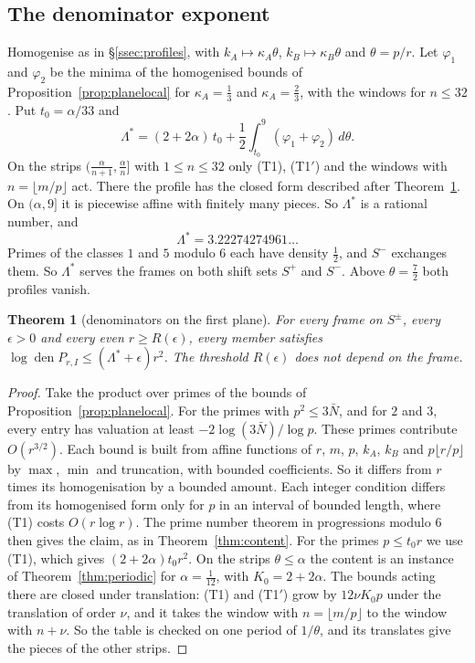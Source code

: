 \documentclass[11pt]{amsart}
\newtheorem{theorem}{Theorem}[section]
\theoremstyle{definition}
\theoremstyle{remark}
\numberwithin{equation}{section}
\newcommand{\den}{\operatorname{den}}
\begin{document}
\subsection{The denominator exponent}
Homogenise as in \S\ref{ssec:profiles}, with $k_A\mapsto\kappa_A\theta$, $k_B\mapsto\kappa_B\theta$ and $\theta=p/r$. Let
$\varphi_1$ and $\varphi_2$ be the minima of the homogenised bounds of Proposition~\ref{prop:planelocal} for
$\kappa_A=\frac13$ and $\kappa_A=\frac23$, with the windows for $n\le32$. Put $t_0=\alpha/33$ and
\[
 \Lambda^*=(2+2\alpha)\,t_0+\frac12\int_{t_0}^{9}(\varphi_1+\varphi_2)\,d\theta .
\]
On the strips $(\frac\alpha{n+1},\frac\alpha n]$ with $1\le n\le32$ only (T1), (T1$'$) and the windows with
$n=\lfloor m/p\rfloor$ act. There the profile has the closed form described after Theorem~\ref{thm:planecontent}. On
$(\alpha,9]$ it is piecewise affine with finitely many pieces. So $\Lambda^*$ is a rational number, and
\[
 \Lambda^*=3.22274274961\ldots
\]
Primes of the classes $1$ and $5$ modulo $6$ each have density $\frac12$, and $S^-$ exchanges them. So $\Lambda^*$ serves
the frames on both shift sets $S^+$ and $S^-$. Above $\theta=\frac72$ both profiles vanish.

\begin{theorem}[denominators on the first plane]\label{thm:planecontent}
For every frame on $S^\pm$, every $\epsilon>0$ and every even $r\ge R(\epsilon)$, every member satisfies
$\log\den P_{r,I}\le(\Lambda^*+\epsilon)r^2$. The threshold $R(\epsilon)$ does not depend on the frame.
\end{theorem}
\begin{proof}
Take the product over primes of the bounds of Proposition~\ref{prop:planelocal}. For the primes with $p^2\le3\bar N$, and for
$2$ and $3$, every entry has valuation at least $-2\log(3\bar N)/\log p$. These primes contribute $O(r^{3/2})$. Each
bound is built from affine functions of $r$, $m$, $p$, $k_A$, $k_B$ and $p\lfloor r/p\rfloor$ by $\max$, $\min$ and
truncation, with bounded coefficients. So it differs from $r$ times its homogenisation by a bounded amount. Each
integer condition differs from its homogenised form only for $p$ in an interval of bounded length, where (T1) costs
$O(r\log r)$. The prime number theorem in progressions modulo $6$ then gives the claim, as in
Theorem~\ref{thm:content}. For the primes $p\le t_0r$ we use (T1), which gives $(2+2\alpha)t_0r^2$. On the strips
$\theta\le\alpha$ the content is an instance of Theorem~\ref{thm:periodic} for $\alpha=\frac1{12}$, with $K_0=2+2\alpha$. The
bounds acting there are closed under translation: (T1) and (T1$'$) grow by $12\nu K_0p$ under the translation of order
$\nu$, and it takes the window with $n=\lfloor m/p\rfloor$ to the window with $n+\nu$. So the table is checked on one
period of $1/\theta$, and its translates give the pieces of the other strips.
\end{proof}
\end{document}
